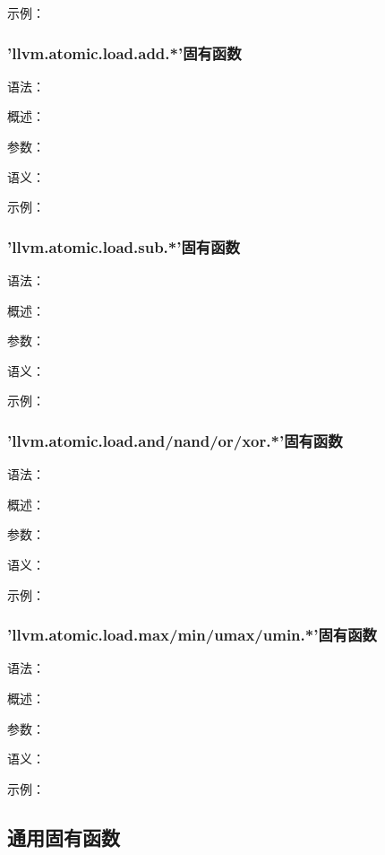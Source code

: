\documentclass[12pt,a4paper]{article}
\begin{document}
{示例：


\subsubsection{'llvm.atomic.load.add.*'固有函数} %

语法：

概述：

参数：

语义：

示例：


\subsubsection{'llvm.atomic.load.sub.*'固有函数} %

语法：

概述：

参数：

语义：

示例：


\subsubsection{'llvm.atomic.load.and/nand/or/xor.*'固有函数} %

语法：

概述：

参数：

语义：

示例：


\subsubsection{'llvm.atomic.load.max/min/umax/umin.*'固有函数} %

语法：

概述：

参数：

语义：

示例：


\subsection{通用固有函数}

}
\end{document}
